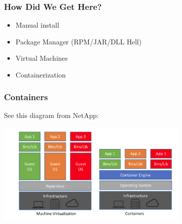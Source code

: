 \begin{frame}
\frametitle{How Did We Get Here?}

\begin{itemize}
	\item Manual install
	\item Package Manager (RPM/JAR/DLL Hell)
	\item Virtual Machines
	\item Containerization
\end{itemize}


\end{frame}


\begin{frame}
\frametitle{Containers}

See this diagram from NetApp:

\begin{center}
	\includegraphics[width=0.7\textwidth]{images/cvm.png}
\end{center}


\end{frame}





